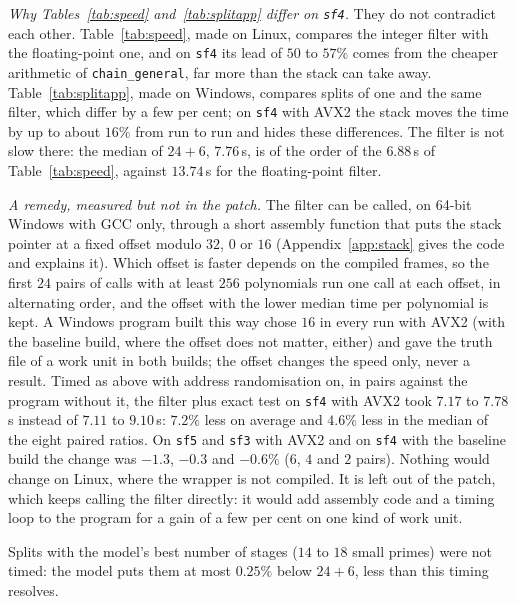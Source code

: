 \documentclass[10pt,a4paper]{article}
\newcommand{\code}[1]{\texttt{#1}}
\theoremstyle{plain}
\theoremstyle{definition}
\begin{document}
\emph{Why Tables~\ref{tab:speed} and~\ref{tab:splitapp} differ on \code{sf4}.}  They do not contradict each other.  Table~\ref{tab:speed}, made on Linux, compares
the integer filter with the floating-point one, and on \code{sf4} its lead of $50$ to $57\%$ comes from the cheaper arithmetic of \code{chain\_general}, far more than
the stack can take away.  Table~\ref{tab:splitapp}, made on Windows, compares splits of one and the same filter, which differ by a few per cent; on \code{sf4} with
AVX2 the stack moves the time by up to about $16\%$ from run to run and hides these differences.  The filter is not slow there: the median of $24+6$, $7.76$\,s, is
of the order of the $6.88$\,s of Table~\ref{tab:speed}, against $13.74$\,s for the floating-point filter.

\emph{A remedy, measured but not in the patch.}  The filter can be called, on 64-bit Windows with GCC only, through a short assembly function that puts the
stack pointer at a fixed offset modulo $32$, $0$ or $16$ (Appendix~\ref{app:stack} gives the code and explains it).  Which offset is faster depends on the compiled
frames, so the first $24$ pairs of calls with at least $256$ polynomials run one call at each offset, in alternating order, and the offset with the lower median time
per polynomial is kept.  A Windows program built this way chose $16$ in every run with AVX2 (with the baseline build, where the offset does not matter, either)
and gave the truth file of a work unit in both builds; the offset changes the speed only, never a result.  Timed as above with address randomisation on, in pairs
against the program without it, the filter plus exact test on \code{sf4} with AVX2 took $7.17$ to $7.78$\,s instead of $7.11$ to $9.10$\,s: $7.2\%$ less on average
and $4.6\%$ less in the median of the eight paired ratios.  On \code{sf5} and \code{sf3} with AVX2 and on \code{sf4} with the baseline build the change was $-1.3$,
$-0.3$ and $-0.6\%$ ($6$, $4$ and $2$ pairs).  Nothing would change on Linux, where the wrapper is not compiled.  It is left out of the patch, which keeps
calling the filter directly: it would add assembly code and a timing loop to the program for a gain of a few per cent on one kind of work unit.

Splits with the model's best number of stages ($14$ to $18$ small primes) were not timed: the model puts them at most $0.25\%$ below $24+6$, less than
this timing resolves.
\end{document}
